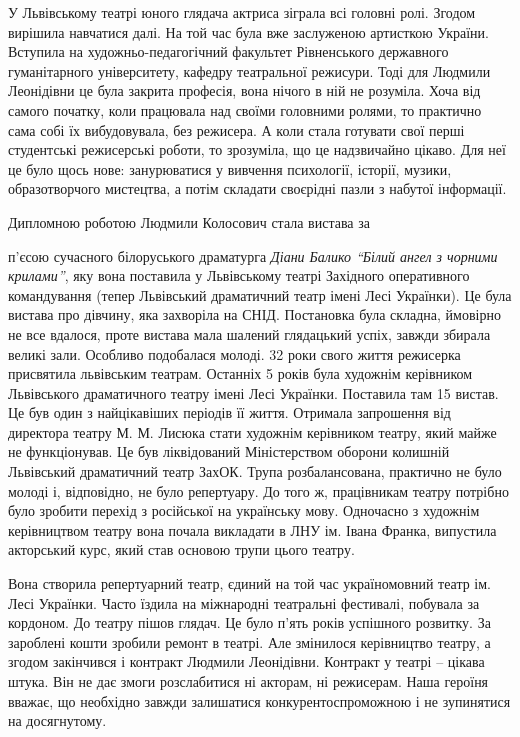 
У Львівському театрі юного глядача актриса зіграла всі головні ролі. Згодом
вирішила навчатися далі. На той час була вже заслуженою артисткою України.
Вступила на художньо-педагогічний факультет Рівненського державного
гуманітарного університету, кафедру театральної режисури. Тоді для Людмили
Леонідівни це була закрита професія, вона нічого в ній не розуміла. Хоча від
самого початку, коли працювала над своїми головними ролями, то практично сама
собі їх вибудовувала, без режисера. А коли стала готувати свої перші
студентські режисерські роботи, то зрозуміла, що це надзвичайно цікаво. Для неї
це було щось нове: занурюватися у вивчення психології, історії, музики,
образотворчого мистецтва, а потім складати своєрідні пазли з набутої
інформації.


Дипломною роботою Людмили Колосович стала вистава за\par\noindent п'єсою сучасного
білоруського драматурга \emph{Діани Балико \enquote{Білий ангел з чорними крилами}}, яку вона
поставила у Львівському театрі Західного оперативного командування (тепер
Львівський драматичний театр імені Лесі Українки). Це була вистава про дівчину,
яка захворіла на СНІД. Постановка була складна, ймовірно не все вдалося, проте
вистава мала шалений глядацький успіх, завжди збирала великі зали. Особливо
подобалася молоді. 32 роки свого життя режисерка присвятила львівським театрам.
Останніх 5 років була художнім керівником Львівського драматичного театру імені
Лесі Українки. Поставила там 15 вистав. Це був один з найцікавіших періодів її
життя. Отримала запрошення від директора театру М. М. Лисюка стати художнім
керівником театру, який майже не функціонував. Це був ліквідований
Міністерством оборони колишній Львівський драматичний театр ЗахОК. Трупа
розбалансована, практично не було молоді і, відповідно, не було репертуару. До
того ж, працівникам театру потрібно було зробити перехід з російської на
українську мову. Одночасно з художнім керівництвом театру вона почала викладати
в ЛНУ ім. Івана Франка, випустила акторський курс, який став основою трупи
цього театру.


Вона створила репертуарний театр, єдиний на той час україномовний театр ім.
Лесі Українки. Часто їздила на міжнародні театральні фестивалі, побувала за
кордоном. До театру пішов глядач. Це було п'ять років успішного розвитку. За
зароблені кошти зробили ремонт в театрі. Але змінилося керівництво театру, а
згодом закінчився і контракт Людмили Леонідівни. Контракт у театрі – цікава
штука. Він не дає змоги розслабитися ні акторам, ні режисерам. Наша героїня
вважає, що необхідно завжди залишатися конкурентоспроможною і не зупинятися на
досягнутому.

